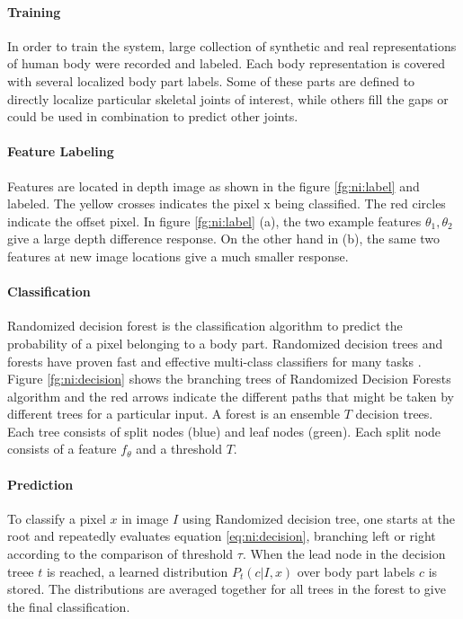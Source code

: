 

\paragraph*{Training} In order to train the system, large collection of synthetic and real representations of human body were recorded and labeled. Each body representation is covered with several localized body part labels. Some of these parts are defined to directly localize particular skeletal joints of interest, while others fill the gaps or could be used in combination to predict other joints.

%

\paragraph*{Feature Labeling} Features are located in depth image as shown in the figure \ref{fg:ni:label} and labeled. The yellow crosses indicates the pixel x being classified. The red circles indicate the offset pixel. In figure \ref{fg:ni:label} (a), the two example features $\theta_1, \theta_2$ give a large depth difference response. On the other hand in (b), the same two features at new image locations give a much smaller response.



\paragraph*{Classification} Randomized decision forest is the classification algorithm to predict the probability of a pixel belonging to a body part. Randomized decision trees and forests have proven fast and effective multi-class classifiers for many tasks \cite{13}. Figure \ref{fg:ni:decision} shows the branching trees of Randomized Decision Forests algorithm and the red arrows indicate the different paths that might be taken by different trees for a particular input. A forest is an ensemble $T$ decision trees. Each tree consists of split nodes (blue) and leaf nodes (green). Each split node consists of a feature $f_\theta$ and a threshold $T$. 



\paragraph*{Prediction} To classify a pixel $x$ in image $I$ using Randomized decision tree, one starts at the root and repeatedly evaluates equation \ref{eq:ni:decision}, branching left or right according to the comparison of threshold {$ \tau$}. When the lead node in the decision treee $t$ is reached, a learned distribution $ P_t(c|I,x) $ over body part labels $c$ is stored. The distributions are averaged together for all trees in the forest to give the final classification.

